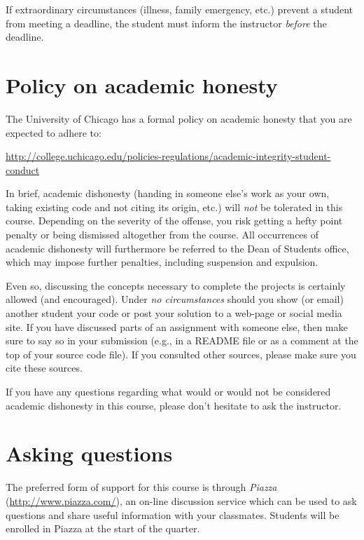 \documentclass[11pt]{article}
\begin{document}
If extraordinary circumstances (illness, family emergency, etc.) prevent a student from meeting a deadline, the student must inform the instructor \emph{before} the deadline.


\section{Policy on academic honesty}

The University of Chicago has a formal policy on academic honesty that you are expected to adhere to:

\begin{center}
\url{http://college.uchicago.edu/policies-regulations/academic-integrity-student-conduct}
\end{center}

In brief, academic dishonesty (handing in someone else's work as your own, taking existing code and not citing its origin, etc.) will \emph{not} be tolerated in this course. Depending on the severity of the offense, you risk getting a hefty point penalty or being dismissed altogether from the course. All occurrences of academic dishonesty will furthermore be referred to the Dean of Students office, which may impose further penalties, including suspension and expulsion.

Even so, discussing the concepts necessary to complete the projects is certainly allowed (and encouraged).  Under \emph{no circumstances} should you show (or email) another student your code or post your solution to a web-page or social media site.  If you have discussed parts of an assignment with someone else, then make sure to say so in your submission (e.g., in a README file or as a comment at the top of your source code file). If you consulted other sources, please make sure you cite these sources.

If you have any questions regarding what would or would not be considered academic dishonesty in this course, please don't hesitate to ask the instructor.


\section{Asking questions}
\label{asking}

The preferred form of support for this course is through \emph{Piazza} (\url{http://www.piazza.com/}), an on-line discussion service which can be used to ask questions and share useful information with your classmates. Students will be enrolled in Piazza at the start of the quarter.
\end{document}
